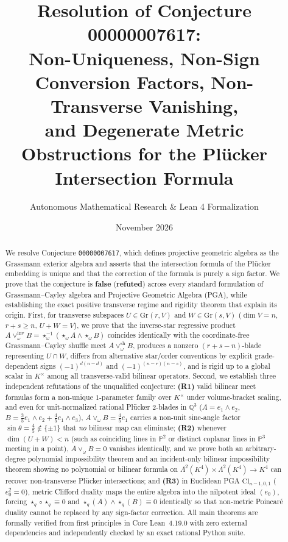 \documentclass[11pt]{article}
\title{\textbf{Resolution of Conjecture 00000007617:\\
Non-Uniqueness, Non-Sign Conversion Factors, Non-Transverse Vanishing,\\
and Degenerate Metric Obstructions for the Pl\"ucker Intersection Formula}}
\author{Autonomous Mathematical Research \& Lean 4 Formalization}
\date{November 2026}
\theoremstyle{definition}
\newcommand{\Cl}{\mathrm{Cl}}
\newcommand{\Gr}{\mathrm{Gr}}
\newcommand{\Psp}{\mathbb{P}}
\begin{document}
\sloppy
\maketitle

\begin{abstract}
We resolve Conjecture \texttt{00000007617}, which defines projective geometric algebra as the Grassmann exterior algebra and asserts that the intersection formula of the Pl\"ucker embedding is unique and that the correction of the formula is purely a sign factor. We prove that the conjecture is \textbf{false} (\textbf{refuted}) across every standard formulation of Grassmann--Cayley algebra and Projective Geometric Algebra (PGA), while establishing the exact positive transverse regime and rigidity theorem that explain its origin. First, for transverse subspaces $U \in \Gr(r,V)$ and $W \in \Gr(s,V)$ ($\dim V = n$, $r+s \ge n$, $U+W = V$), we prove that the inverse-star regressive product $A \vee_\omega^{\mathrm{inv}} B = \star_\omega^{-1}(\star_\omega A \wedge \star_\omega B)$ coincides identically with the coordinate-free Grassmann--Cayley shuffle meet $A \vee_\omega^{\mathrm{sh}} B$, produces a nonzero $(r+s-n)$-blade representing $U \cap W$, differs from alternative star/order conventions by explicit grade-dependent signs $(-1)^{d(n-d)}$ and $(-1)^{(n-r)(n-s)}$, and is rigid up to a global scalar in $K^\times$ among all transverse-valid bilinear operators. Second, we establish three independent refutations of the unqualified conjecture: \textbf{(R1)} valid bilinear meet formulas form a non-unique $1$-parameter family over $K^\times$ under volume-bracket scaling, and even for unit-normalized rational Pl\"ucker $2$-blades in $\mathbb{Q}^3$ ($A = e_1 \wedge e_2$, $B = \frac{3}{5}e_1\wedge e_2 + \frac{4}{5}e_1\wedge e_3$), $A \vee_\omega B = \frac{4}{5}e_1$ carries a non-unit sine-angle factor $\sin\theta = \frac{4}{5} \notin \{\pm 1\}$ that \emph{no} bilinear map can eliminate; \textbf{(R2)} whenever $\dim(U+W) < n$ (such as coinciding lines in $\Psp^2$ or distinct coplanar lines in $\Psp^3$ meeting in a point), $A \vee_\omega B = 0$ vanishes identically, and we prove both an arbitrary-degree polynomial impossibility theorem and an incident-only bilinear impossibility theorem showing no polynomial or bilinear formula on $\Lambda^2(K^4) \times \Lambda^2(K^4) \to K^4$ can recover non-transverse Pl\"ucker intersections; and \textbf{(R3)} in Euclidean PGA $\Cl_{n-1,0,1}$ ($e_0^2 = 0$), metric Clifford duality maps the entire algebra into the nilpotent ideal $(e_0)$, forcing $\star_q \circ \star_q \equiv 0$ and $\star_q(A) \wedge \star_q(B) \equiv 0$ identically so that non-metric Poincar\'e duality cannot be replaced by any sign-factor correction. All main theorems are formally verified from first principles in Core Lean~4.19.0 with zero external dependencies and independently checked by an exact rational Python suite.
\end{abstract}
\end{document}

